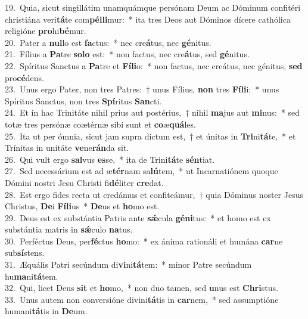 {19.~}Quia, sicut singillátim unamquámque persónam Deum ac Dóminum confitéri christiána veri\textbf{tá}te com\textbf{pél}\textbf{li}mur:~* ita tres Deos aut Dóminos dícere cathólica religióne \textbf{pro}hi\textbf{bé}mur.\\
{20.~}Pater a \textbf{nul}lo est \textbf{fa}ctus:~* nec cre\textbf{á}tus, nec \textbf{gé}nitus.\\
{21.~}Fílius a \textbf{Pa}tre \textbf{so}\textbf{lo} est:~* non factus, nec cre\textbf{á}tus, sed \textbf{gé}nitus.\\
{22.~}Spíritus Sanctus a \textbf{Pa}tre et \textbf{Fí}\textbf{li}o:~* non factus, nec creátus, nec génitus, \textbf{sed} pro\textbf{cé}dens.\\
{23.~}Unus ergo Pater, non tres Patres:~† unus Fílius, \textbf{non} tres \textbf{Fí}\textbf{li}i:~* unus Spíritus Sanctus, non tres \textbf{Spí}ritus \textbf{San}cti.\\
{24.~}Et in hac Trinitáte nihil prius aut postérius,~† nihil \textbf{ma}jus aut \textbf{mi}nus:~* sed totæ tres persónæ coætérnæ sibi sunt et \textbf{co}æ\textbf{quá}les.\\
{25.~}Ita ut per ómnia, sicut jam supra dictum est,~† et únitas in \textbf{Tri}ni\textbf{tá}te,~* et Trínitas in unitáte \textbf{ve}ne\textbf{rán}da sit.\\
{26.~}Qui vult ergo \textbf{sal}vus \textbf{es}se,~* ita de Trini\textbf{tá}te \textbf{sén}tiat.\\
{27.~}Sed necessárium est ad æ\textbf{tér}nam sa\textbf{lú}tem,~* ut Incarnatiónem quoque Dómini nostri Jesu Christi fi\textbf{dé}liter \textbf{cre}dat.\\
{28.~}Est ergo fides recta ut credámus et confiteámur,~† quia Dóminus noster Jesus Christus, \textbf{De}i \textbf{Fí}\textbf{li}us~* \textbf{De}us et \textbf{ho}mo est.\\
{29.~}Deus est ex substántia Patris ante \textbf{sǽ}cula \textbf{gé}\textbf{ni}tus:~* et homo est ex substántia matris in \textbf{sǽ}culo \textbf{na}tus.\\
{30.~}Perféctus Deus, per\textbf{fé}ctus \textbf{ho}mo:~* ex ánima rationáli et humána \textbf{car}ne sub\textbf{sí}stens.\\
{31.~}Æquális Patri secúndum di\textbf{vi}ni\textbf{tá}tem:~* minor Patre secúndum hu\textbf{ma}ni\textbf{tá}tem.\\
{32.~}Qui, licet Deus \textbf{sit} et \textbf{ho}mo,~* non duo tamen, sed \textbf{u}nus est \textbf{Chri}stus.\\
{33.~}Unus autem non conversióne divini\textbf{tá}tis in \textbf{car}nem,~* sed assumptióne humani\textbf{tá}tis in \textbf{De}um.\\
